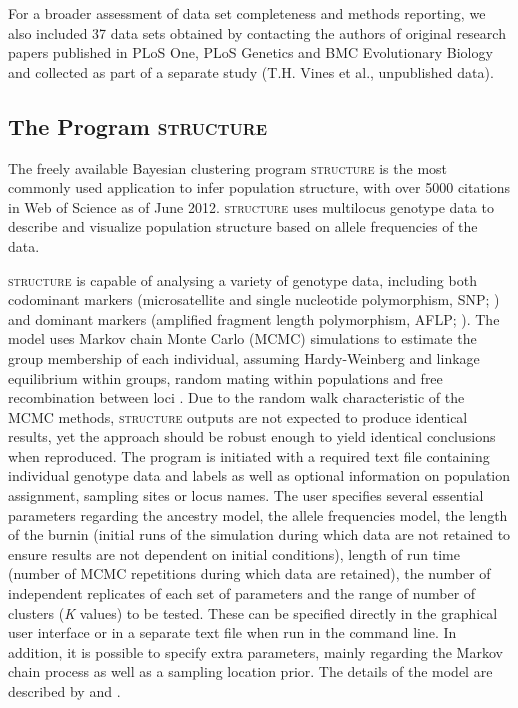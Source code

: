 For a broader assessment of data set completeness and methods reporting, we also included 37 
data sets obtained by contacting the authors of original research papers published in PLoS One, 
PLoS Genetics and BMC Evolutionary Biology and collected as part of a separate study (T.H. Vines et al., unpublished data).

\subsection{The Program \textsc{structure}}
The freely available Bayesian clustering program \textsc{structure} \citep{Pritchard:2000} 
is the most commonly used application to infer population structure, with over 5000 citations 
in Web of Science as of June 2012. \textsc{structure} uses multilocus genotype data to 
describe and visualize population structure based on allele frequencies of the data.

\textsc{structure} is capable of analysing a variety of genotype data, including both 
codominant markers (microsatellite and single nucleotide polymorphism, SNP; \citealt{Pritchard:2000}) 
and dominant markers (amplified fragment length polymorphism, AFLP; \citealt{Falush:2003}). 
The model uses Markov chain Monte Carlo (MCMC) simulations to estimate the group membership 
of each individual, assuming Hardy-Weinberg and linkage equilibrium within groups, random 
mating within populations and free recombination between loci \citep{Pritchard:2000}. 
Due to the random walk characteristic of the MCMC methods, \textsc{structure} outputs 
are not expected to produce identical results, yet the approach should be robust enough 
to yield identical conclusions when reproduced. The program is initiated with a required 
text file containing individual genotype data and labels as well as optional information 
on population assignment, sampling sites or locus names. The user specifies several 
essential parameters regarding the ancestry model, the allele frequencies model, 
the length of the burnin (initial runs of the simulation during which data are not 
retained to ensure results are not dependent on initial conditions), length of run 
time (number of MCMC repetitions during which data are retained), the number of 
independent replicates of each set of parameters and the range of number of clusters 
(\emph{K} values) to be tested. These can be specified directly in the graphical user interface 
or in a separate text file when run in the command line. In addition, it is possible to 
specify extra parameters, mainly regarding the Markov chain process as well as a sampling 
location prior. The details of the model are described by \citet{Pritchard:2000, Pritchard:2007} 
and \citet{Falush:2003, Falush:2007}.

